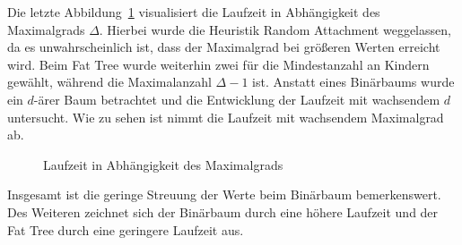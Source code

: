 Die letzte Abbildung~\ref{fig:rundeg} visualisiert die Laufzeit in Abhängigkeit des Maximalgrads $\Delta$.
Hierbei wurde die Heuristik Random Attachment weggelassen, da es unwahrscheinlich ist, dass der Maximalgrad bei größeren Werten erreicht wird.
Beim Fat Tree wurde weiterhin zwei für die Mindestanzahl an Kindern gewählt, während die Maximalanzahl $\Delta - 1$ ist.
Anstatt eines Binärbaums wurde ein $d$\hyp ärer Baum betrachtet und die Entwicklung der Laufzeit mit wachsendem $d$ untersucht.
Wie zu sehen ist nimmt die Laufzeit mit wachsendem Maximalgrad ab.
\begin{figure}
    \centering
    
    \caption{Laufzeit in Abhängigkeit des Maximalgrads\label{fig:rundeg}}
\end{figure}

Insgesamt ist die geringe Streuung der Werte beim Binärbaum bemerkenswert.
Des Weiteren zeichnet sich der Binärbaum durch eine höhere Laufzeit und der Fat Tree durch eine geringere Laufzeit aus.

